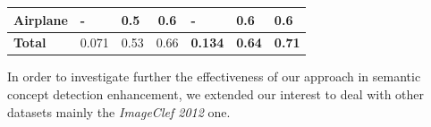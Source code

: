 \begin{table}[h]
\begin{tabular}{lp{1.2cm}p{1.2cm}p{1.2cm}p{1.2cm}p{1.2cm}p{1.2cm}}
\multicolumn{1}{l|}{Airplane}                                            & -                         & 0.5                      & \multicolumn{1}{c|}{0.6}                 & -                                  & 0.6                               & 0.6                               \\ \hline\hline
\textbf{Total}                                                           & \multicolumn{1}{|l}{0.071}  & 0.53 & \multicolumn{1}{l|}{0.66}                & \multicolumn{1}{l}{\textbf{0.134}} & \multicolumn{1}{l}{\textbf{0.64}} & \multicolumn{1}{l}{\textbf{0.71}} \\ \hline
\end{tabular}
\end{table}



		In order to investigate further the effectiveness of our approach in semantic concept detection 
		enhancement, we extended our interest to deal with other datasets mainly 
		the \textit{ImageClef 2012} one.


